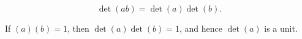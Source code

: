 $$\det(ab) = \det(a)\det(b).$$

If $(a)(b) = 1$, then $\det(a)\det(b) = 1$, and hence $\det(a)$ is a unit.
